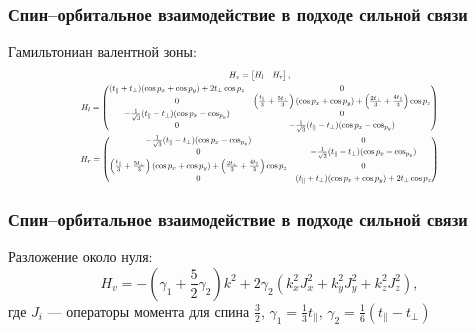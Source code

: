 \documentclass{beamer}
\begin{document}
\begin{frame}
    \frametitle{Спин--орбитальное взаимодействие в подходе сильной связи}
    Гамильтониан валентной зоны:
    \begin{equation}
        \scalebox{0.6}{
        $
        \begin{gathered}
        H_v = \begin{bmatrix}
                H_l & H_r
            \end{bmatrix},\\
        H_l = 
        \begin{pmatrix}
            (t_\parallel + t_\perp)(\cos{p_x} + \cos{p_y}) + 2t_\perp \cos{p_z} & 0 \\
            0 & \left(\frac{t_\parallel}{3} + \frac{5t_\perp}{3}\right)(\cos{p_x}+\cos{p_y})+ 
                          \left(\frac{2t_\perp}{3} + \frac{4t_\parallel}{3}\right)\cos{p_z} \\
            -\frac{1}{\sqrt{3}}(t_\parallel - t_\perp)(\cos{p_x} - \cos_{p_y}) & 0 \\
            0 & -\frac{1}{\sqrt{3}}(t_\parallel - t_\perp)(\cos{p_x} - \cos_{p_y}) 
        \end{pmatrix}\\
        H_r = 
        \begin{pmatrix}
            -\frac{1}{\sqrt{3}}(t_\parallel - t_\perp)(\cos{p_x} - \cos_{p_y}) & 0 \\
            0 & -\frac{1}{\sqrt{3}}(t_\parallel - t_\perp)(\cos{p_x} - \cos_{p_y})\\
           \left(\frac{t_\parallel}{3} + \frac{5t_\perp}{3}\right)(\cos{p_x} + \cos{p_y}) + 
                     \left(\frac{2t_\perp}{3} + \frac{4t_\parallel}{3}\right)\cos{p_z} & 0 \\
            0 & (t_\parallel + t_\perp)(\cos{p_x} + \cos{p_y}) + 2t_\perp \cos{p_z}
        \end{pmatrix}
        \end{gathered}
        $
        }
    \end{equation}
\end{frame}
\begin{frame}
    \frametitle{Спин--орбитальное взаимодействие в подходе сильной связи}
    Разложение около нуля:
    \begin{equation}
    H_v = -\left(\gamma_1 + \frac{5}{2}\gamma_2\right) k^2 + 
        2\gamma_2(k_x^2J_x^2 + k_y^2J_y^2 + k_z^2J_z^2),
    \end{equation}
    где $J_i$ --- операторы момента для спина $\frac{3}{2}$, $\gamma_1 = \frac13 t_\parallel$,
    $\gamma_2 = \frac16(t_\parallel - t_\perp)$
\end{frame}
\end{document}
